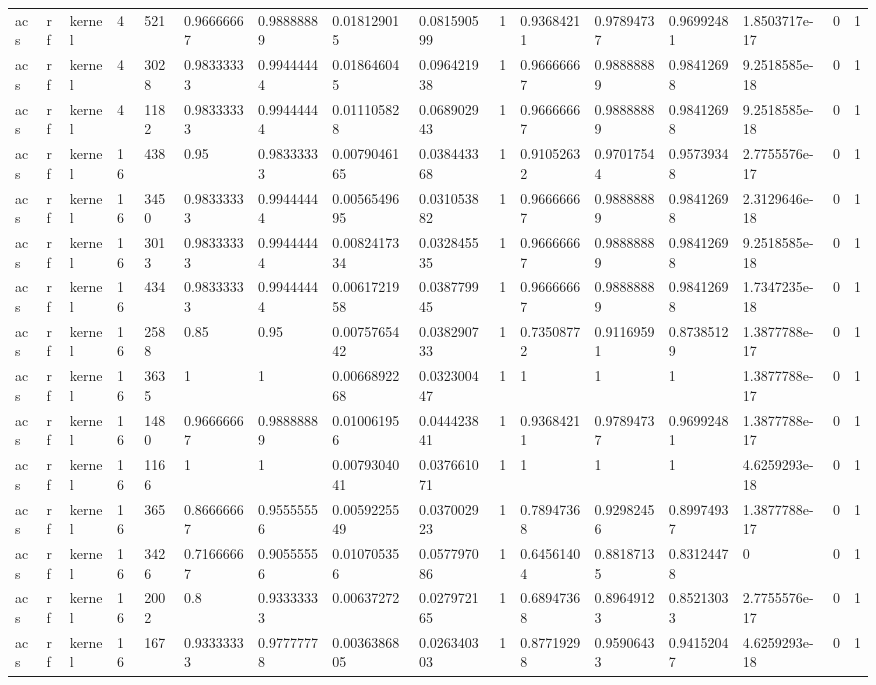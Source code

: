 \begin{tabular}{llllllllllllllll}
acs & rf & kernel & 4 & 521 & 0.96666667 & 0.98888889 & 0.018129015 & 0.081590599 & 1 & 0.93684211 & 0.97894737 & 0.96992481 & 1.8503717e-17 & 0 & 1 \\
acs & rf & kernel & 4 & 3028 & 0.98333333 & 0.99444444 & 0.018646045 & 0.096421938 & 1 & 0.96666667 & 0.98888889 & 0.98412698 & 9.2518585e-18 & 0 & 1 \\
acs & rf & kernel & 4 & 1182 & 0.98333333 & 0.99444444 & 0.011105828 & 0.068902943 & 1 & 0.96666667 & 0.98888889 & 0.98412698 & 9.2518585e-18 & 0 & 1 \\
acs & rf & kernel & 16 & 438 & 0.95 & 0.98333333 & 0.0079046165 & 0.038443368 & 1 & 0.91052632 & 0.97017544 & 0.95739348 & 2.7755576e-17 & 0 & 1 \\
acs & rf & kernel & 16 & 3450 & 0.98333333 & 0.99444444 & 0.0056549695 & 0.031053882 & 1 & 0.96666667 & 0.98888889 & 0.98412698 & 2.3129646e-18 & 0 & 1 \\
acs & rf & kernel & 16 & 3013 & 0.98333333 & 0.99444444 & 0.0082417334 & 0.032845535 & 1 & 0.96666667 & 0.98888889 & 0.98412698 & 9.2518585e-18 & 0 & 1 \\
acs & rf & kernel & 16 & 434 & 0.98333333 & 0.99444444 & 0.0061721958 & 0.038779945 & 1 & 0.96666667 & 0.98888889 & 0.98412698 & 1.7347235e-18 & 0 & 1 \\
acs & rf & kernel & 16 & 2588 & 0.85 & 0.95 & 0.0075765442 & 0.038290733 & 1 & 0.73508772 & 0.91169591 & 0.87385129 & 1.3877788e-17 & 0 & 1 \\
acs & rf & kernel & 16 & 3635 & 1 & 1 & 0.0066892268 & 0.032300447 & 1 & 1 & 1 & 1 & 1.3877788e-17 & 0 & 1 \\
acs & rf & kernel & 16 & 1480 & 0.96666667 & 0.98888889 & 0.010061956 & 0.044423841 & 1 & 0.93684211 & 0.97894737 & 0.96992481 & 1.3877788e-17 & 0 & 1 \\
acs & rf & kernel & 16 & 1166 & 1 & 1 & 0.0079304041 & 0.037661071 & 1 & 1 & 1 & 1 & 4.6259293e-18 & 0 & 1 \\
acs & rf & kernel & 16 & 365 & 0.86666667 & 0.95555556 & 0.0059225549 & 0.037002923 & 1 & 0.78947368 & 0.92982456 & 0.89974937 & 1.3877788e-17 & 0 & 1 \\
acs & rf & kernel & 16 & 3426 & 0.71666667 & 0.90555556 & 0.010705356 & 0.057797086 & 1 & 0.64561404 & 0.88187135 & 0.83124478 & 0 & 0 & 1 \\
acs & rf & kernel & 16 & 2002 & 0.8 & 0.93333333 & 0.00637272 & 0.027972165 & 1 & 0.68947368 & 0.89649123 & 0.85213033 & 2.7755576e-17 & 0 & 1 \\
acs & rf & kernel & 16 & 167 & 0.93333333 & 0.97777778 & 0.0036386805 & 0.026340303 & 1 & 0.87719298 & 0.95906433 & 0.94152047 & 4.6259293e-18 & 0 & 1 \\

\end{tabular}
